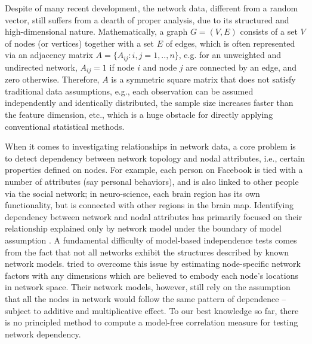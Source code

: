 \documentclass[11pt]{article}
\theoremstyle{definition}
\begin{document}
Despite of many recent development, the network data, different from a random vector, still suffers from a dearth of proper analysis, due to its structured and high-dimensional nature. Mathematically, a graph $G=(V,E)$ consists of a set $V$ of nodes (or vertices) together with a set $E$ of edges, which is often represented via an adjacency matrix $A = \{A_{ij} : i,j= 1,..,n \}$, e.g. for an unweighted and undirected network, $A_{ij} = 1$ if node $i$ and node $j$ are connected by an edge, and zero otherwise. Therefore, $A$ is a symmetric square matrix that does not satisfy traditional data assumptions, e.g., each observation can be assumed independently and identically distributed, the sample size increases faster than the feature dimension, etc., which is a huge obstacle for directly applying conventional statistical methods. 

When it comes to investigating relationships in network data, a core problem is to detect dependency between network topology and nodal attributes, i.e., certain properties defined on nodes. For example, each person on Facebook is tied with a number of attributes (say personal behaviors), and is also linked to other people via the social network; in neuro-science, each brain region has its own functionality, but is connected with other regions in the brain map. Identifying dependency between network and nodal attributes has primarily focused on their relationship explained only by network model under the boundary of model assumption \citep{wasserman1996logit, howard2016understanding, fosdick2015testing}. A fundamental difficulty of model-based independence tests comes from the fact that not all networks exhibit the structures described by known network models. \cite{fosdick2015testing} tried to overcome this issue by estimating node-specific network factors with any dimensions which are believed to embody each node's locations in network space. Their network models, however, still rely on the assumption that all the nodes in network would follow the same pattern of dependence -- subject to additive and multiplicative effect. To our best knowledge so far, there is no principled method to compute a model-free correlation measure for testing network dependency. 
\end{document}
